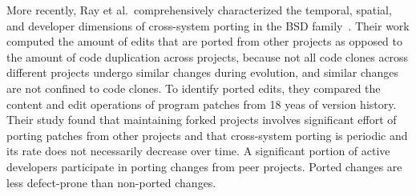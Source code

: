 More recently, Ray et al.~comprehensively characterized the temporal, spatial, and developer dimensions of cross-system porting in the BSD family~\cite{Ray2012:FSE}. Their work computed the amount of edits that are ported from other projects as opposed to the amount of code duplication across projects, because not all code clones across different projects undergo similar changes during evolution, and similar changes are not confined to code clones. To identify ported edits, they compared the content and edit operations of program patches from 18 yeas of version history. Their study found that maintaining forked projects involves significant effort of porting patches from other projects and that cross-system porting is periodic and its rate does not necessarily decrease over time. A significant portion of active developers participate in porting changes from peer projects. Ported changes are less defect-prone than non-ported changes. 




